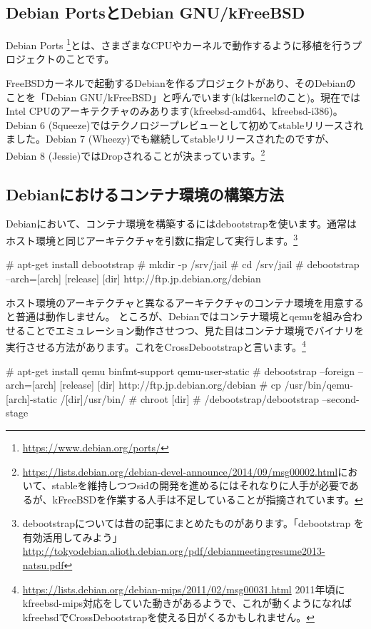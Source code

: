 \documentclass[mingoth,a4paper]{jsarticle}
\begin{document}
\subsection{Debian PortsとDebian GNU/kFreeBSD}

Debian Ports \footnote{\url{https://www.debian.org/ports/}}とは、さまざまなCPUやカーネルで動作するように移植を行うプロジェクトのことです。

FreeBSDカーネルで起動するDebianを作るプロジェクトがあり、そのDebianのことを「Debian GNU/kFreeBSD」と呼んでいます(kはkernelのこと)。現在ではIntel CPUのアーキテクチャのみあります(kfreebsd-amd64、kfreebsd-i386)。Debian 6 (Squeeze)ではテクノロジープレビューとして初めてstableリリースされました。Debian 7 (Wheezy)でも継続してstableリリースされたのですが、Debian 8 (Jessie)ではDropされることが決まっています。\footnote{\url{https://lists.debian.org/debian-devel-announce/2014/09/msg00002.html}において、stableを維持しつつsidの開発を進めるにはそれなりに人手が必要であるが、kFreeBSDを作業する人手は不足していることが指摘されています。}

\subsection{Debianにおけるコンテナ環境の構築方法}

Debianにおいて、コンテナ環境を構築するにはdebootstrapを使います。通常はホスト環境と同じアーキテクチャを引数に指定して実行します。\footnote{debootstrapについては昔の記事にまとめたものがあります。「debootstrap を有効活用してみよう」\url{http://tokyodebian.alioth.debian.org/pdf/debianmeetingresume2013-natsu.pdf}}

\begin{commandline}
# apt-get install debootstrap
# mkdir -p /srv/jail
# cd /srv/jail
# debootstrap --arch=[arch] [release] [dir] http://ftp.jp.debian.org/debian
\end{commandline}

ホスト環境のアーキテクチャと異なるアーキテクチャのコンテナ環境を用意すると普通は動作しません。
ところが、Debianではコンテナ環境とqemuを組み合わせることでエミュレーション動作させつつ、見た目はコンテナ環境でバイナリを実行させる方法があります。これをCrossDebootstrapと言います。\footnote{\url{https://lists.debian.org/debian-mips/2011/02/msg00031.html} 2011年頃にkfreebsd-mips対応をしていた動きがあるようで、これが動くようになればkfreebsdでCrossDebootstrapを使える日がくるかもしれません。}

\begin{commandline}
# apt-get install qemu binfmt-support qemu-user-static
# debootstrap --foreign --arch=[arch] [release] [dir] http://ftp.jp.debian.org/debian
# cp /usr/bin/qemu-[arch]-static /[dir]/usr/bin/
# chroot [dir]
# /debootstrap/debootstrap --second-stage
\end{commandline}
\end{document}

